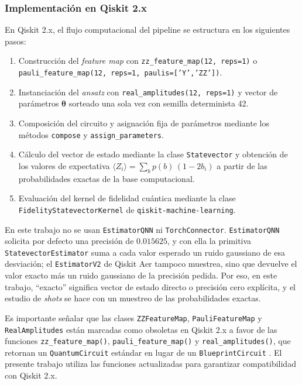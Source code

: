 
\subsubsection{Implementación en Qiskit 2.x}

En Qiskit 2.x, el flujo computacional del pipeline se estructura en los siguientes pasos:
\begin{enumerate}
  \item Construcción del \textit{feature map} con \texttt{zz\_feature\_map(12, reps=1)} o \texttt{pauli\_feature\_map(12, reps=1, paulis=['Y','ZZ'])}.
  \item Instanciación del \textit{ansatz} con \texttt{real\_amplitudes(12, reps=1)} y vector de parámetros $\boldsymbol{\theta}$ sorteado una sola vez con semilla determinista 42.
  \item Composición del circuito y asignación fija de parámetros mediante los métodos \texttt{compose} y \texttt{assign\_parameters}.
  \item Cálculo del vector de estado mediante la clase \texttt{Statevector} y obtención de los valores de expectativa $\langle Z_i\rangle = \sum_b p(b)\,(1-2b_i)$ a partir de las probabilidades exactas de la base computacional.
  \item Evaluación del kernel de fidelidad cuántica mediante la clase \texttt{FidelityStatevectorKernel} de \texttt{qiskit-machine-learning}.
\end{enumerate}

En este trabajo no se usan \texttt{EstimatorQNN} ni \texttt{TorchConnector}. \texttt{EstimatorQNN} solicita por defecto una precisión de $0.015625$, y con ella la primitiva \texttt{StatevectorEstimator} suma a cada valor esperado un ruido gaussiano de esa desviación; el \texttt{EstimatorV2} de Qiskit Aer tampoco muestrea, sino que devuelve el valor exacto más un ruido gaussiano de la precisión pedida. Por eso, en este trabajo, ``exacto'' significa vector de estado directo o precisión cero explícita, y el estudio de \textit{shots} se hace con un muestreo de las probabilidades exactas.

Es importante señalar que las clases \texttt{ZZFeatureMap}, \texttt{PauliFeatureMap} y \texttt{RealAmplitudes} están marcadas como obsoletas en Qiskit 2.x a favor de las funciones \texttt{zz\_feature\_map()}, \texttt{pauli\_feature\_map()} y \texttt{real\_amplitudes()}, que retornan un \texttt{QuantumCircuit} estándar en lugar de un \texttt{BlueprintCircuit} \cite{ibmquantum2024docs}. El presente trabajo utiliza las funciones actualizadas para garantizar compatibilidad con Qiskit 2.x.
